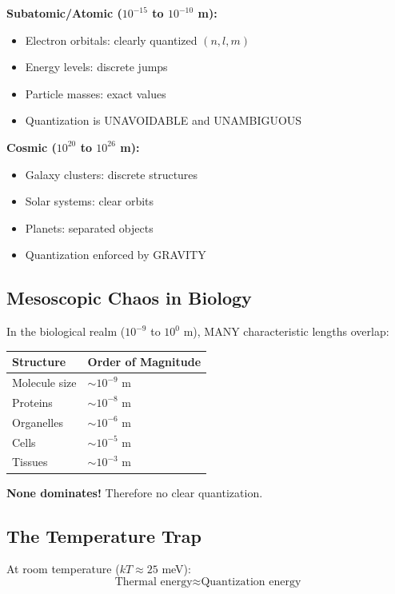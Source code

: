 	\textbf{Subatomic/Atomic ($10^{-15}$ to $10^{-10}$ m):}
	\begin{itemize}
		\item Electron orbitals: clearly quantized $(n, l, m)$
		\item Energy levels: discrete jumps
		\item Particle masses: exact values
		\item Quantization is UNAVOIDABLE and UNAMBIGUOUS
	\end{itemize}
	
	\textbf{Cosmic ($10^{20}$ to $10^{26}$ m):}
	\begin{itemize}
		\item Galaxy clusters: discrete structures
		\item Solar systems: clear orbits
		\item Planets: separated objects
		\item Quantization enforced by GRAVITY
	\end{itemize}
	
	\subsection{Mesoscopic Chaos in Biology}
	
	In the biological realm ($10^{-9}$ to $10^0$ m), MANY characteristic lengths overlap:
	
	\begin{center}
		\begin{tabular}{ll}
			\toprule
			Structure & Order of Magnitude\\
			\midrule
			Molecule size & $\sim 10^{-9}$ m\\
			Proteins & $\sim 10^{-8}$ m\\
			Organelles & $\sim 10^{-6}$ m\\
			Cells & $\sim 10^{-5}$ m\\
			Tissues & $\sim 10^{-3}$ m\\
			\bottomrule
		\end{tabular}
	\end{center}
	
	\textbf{None dominates!} Therefore no clear quantization.
	
	\subsection{The Temperature Trap}
	
	At room temperature ($kT \approx 25$ meV):
	\begin{equation}
		\text{Thermal energy} \approx \text{Quantization energy}
	\end{equation}
	
